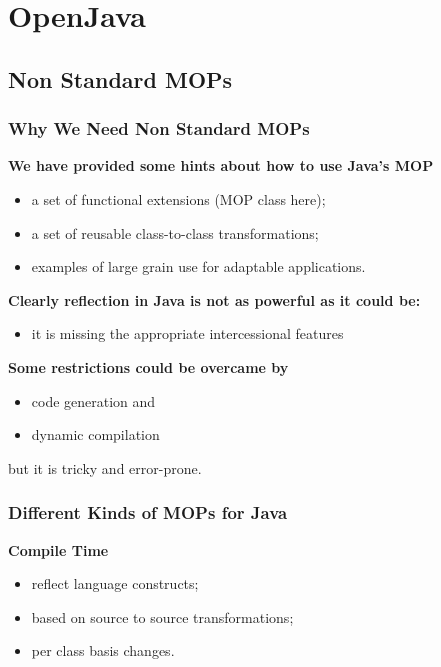 \section{OpenJava}

\subsection{Non Standard MOPs}

\subsubsection{Why We Need Non Standard MOPs}

\textbf{We have provided some hints about how to use Java’s MOP}

\begin{itemize}
	\item a set of functional extensions (MOP class here);
	\item a set of reusable class-to-class transformations;
	\item examples of large grain use for adaptable applications.
\end{itemize}

\textbf{Clearly reflection in Java is not as powerful as it could be:}

\begin{itemize}
	\item it is missing the appropriate intercessional features
\end{itemize}

\textbf{Some restrictions could be overcame by}

\begin{itemize}
	\item code generation and
	\item dynamic compilation
\end{itemize}

but it is tricky and error-prone.

\subsubsection{Different Kinds of MOPs for Java}

\textbf{Compile Time}

\begin{itemize}
	\item reflect language constructs;
	\item based on source to source transformations;
	\item per class basis changes.
\end{itemize}

